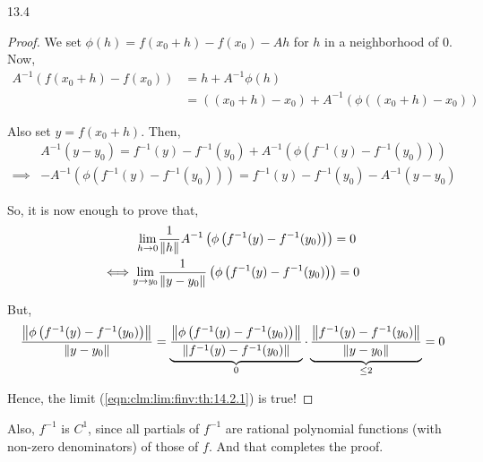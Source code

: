 \documentclass[../Analysis-3.tex]{subfiles}
\begin{document}
\begin{proofFig}{}{}{\label{fig:inf:fun}}{13}{.4\textwidth}
\begin{proof}
    We set $ \phi(h) = f(x_0+h) - f(x_0) - Ah $ for $ h $ in a neighborhood of $ 0 $. Now,
    \begin{align*}
      A^{-1}\left( f(x_0+h) - f(x_0) \right)
       & = h + A^{-1}\phi(h)                                          \\
       & = ((x_0+h) - x_0) + A^{-1}\left( \phi((x_0+h) - x_0) \right)
    \end{align*}

    Also set $ y = f(x_0+h) $. Then,
    \begin{align}
               & A^{-1}(y-y_0) = f^{-1}(y) - f^{-1}(y_0) + A^{-1}\left( \phi\left(f^{-1}(y) - f^{-1}(y_0)\right) \right)  \nonumber                                              \\
      \implies & -A^{-1}\left( \phi\left(f^{-1}(y) - f^{-1}(y_0)\right) \right) = f^{-1}(y) - f^{-1}(y_0) - A^{-1}(y-y_0)  \label{eqn:clm:limtermintermsofAinvphifinv:th:14.2.1}
    \end{align}

    So, it is now enough to prove that,
    \begin{align*}
      \lim_{h \to 0}                       & \frac{1}{\norm{h}}A^{-1}\left( \phi\left(f^{-1}(y) - f^{-1}(y_0)\right) \right)              = 0 \\
      \Longleftrightarrow \lim_{y \to y_0} & \frac{1}{\norm{y-y_0}}\left( \phi\left(f^{-1}(y) - f^{-1}(y_0)\right) \right) = 0
    \end{align*}

    But,
    \[  \frac{\norm{\phi\left(f^{-1}(y) - f^{-1}(y_0)\right)}}{\norm{y-y_0}} = \underbrace{\frac{\norm{\phi\left(f^{-1}(y) - f^{-1}(y_0)\right)}}{\norm{f^{-1}(y) - f^{-1}(y_0)}}}_{0} \cdot \underbrace{\frac{\norm{f^{-1}(y) - f^{-1}(y_0)}}{\norm{y-y_0}}}_{\leq 2} = 0  \]

    Hence, the limit (\ref{eqn:clm:lim:finv:th:14.2.1}) is true!
  \end{proof}
  Also, $ f^{-1} $ is $ C^1 $, since all partials of $ f^{-1} $ are rational polynomial functions (with non-zero denominators) of those of $ f $. And that completes the proof.
\end{proofFig}
\end{document}
